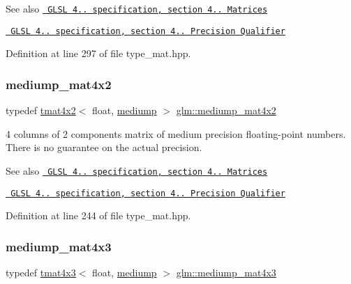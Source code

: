 \begin{DoxySeeAlso}{See also}
\href{http://www.opengl.org/registry/doc/GLSLangSpec.4.20.8.pdf}{\texttt{ G\+L\+SL 4.. specification, section 4.. Matrices}} 

\href{http://www.opengl.org/registry/doc/GLSLangSpec.4.20.8.pdf}{\texttt{ G\+L\+SL 4.. specification, section 4.. Precision Qualifier}} 
\end{DoxySeeAlso}


Definition at line 297 of file type\+\_\+mat.\+hpp.

\mbox{\label{group__core__precision_gaa8a2840660d106dca70acf525e8bfa6c}} 
\subsubsection{\texorpdfstring{mediump\_mat4x2}{mediump\_mat4x2}}
{\footnotesize\ttfamily typedef \mbox{\hyperlink{structglm_1_1tmat4x2}{tmat4x2}}$<$ float, \mbox{\hyperlink{namespaceglm_a0f04f086094c747d227af4425893f545a6416f3ea0c9025fb21ed50c4d6620482}{mediump}} $>$ \mbox{\hyperlink{group__core__precision_gaa8a2840660d106dca70acf525e8bfa6c}{glm\+::mediump\+\_\+mat4x2}}}

4 columns of 2 components matrix of medium precision floating-\/point numbers. There is no guarantee on the actual precision.

\begin{DoxySeeAlso}{See also}
\href{http://www.opengl.org/registry/doc/GLSLangSpec.4.20.8.pdf}{\texttt{ G\+L\+SL 4.. specification, section 4.. Matrices}} 

\href{http://www.opengl.org/registry/doc/GLSLangSpec.4.20.8.pdf}{\texttt{ G\+L\+SL 4.. specification, section 4.. Precision Qualifier}} 
\end{DoxySeeAlso}


Definition at line 244 of file type\+\_\+mat.\+hpp.

\mbox{\label{group__core__precision_ga98bbda89d371b41b3d56bcbc7a4d868d}} 
\subsubsection{\texorpdfstring{mediump\_mat4x3}{mediump\_mat4x3}}
{\footnotesize\ttfamily typedef \mbox{\hyperlink{structglm_1_1tmat4x3}{tmat4x3}}$<$ float, \mbox{\hyperlink{namespaceglm_a0f04f086094c747d227af4425893f545a6416f3ea0c9025fb21ed50c4d6620482}{mediump}} $>$ \mbox{\hyperlink{group__core__precision_ga98bbda89d371b41b3d56bcbc7a4d868d}{glm\+::mediump\+\_\+mat4x3}}}

